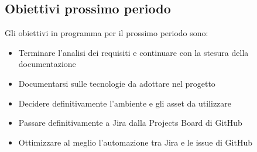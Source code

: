 \subsection{Obiettivi prossimo periodo}
Gli obiettivi in programma per il prossimo periodo sono:
\begin{itemize}
\item Terminare l'analisi dei requisiti e continuare con la stesura della documentazione
\item Documentarsi sulle tecnologie da adottare nel progetto
\item Decidere definitivamente l'ambiente e gli asset da utilizzare
\item Passare definitivamente a Jira dalla Projects Board di GitHub
\item Ottimizzare al meglio l'automazione tra Jira e le issue di GitHub
\end{itemize}
